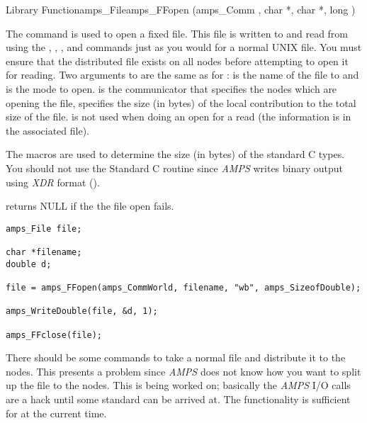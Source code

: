 \begin{deftypefn}{Library Function}{amps_File}{amps\_FFopen}
(amps_Comm , char *, char *, long )

\DESCRIPTION

The  command is used to open a fixed file.  This
file is written to and read from using the ,
, , and
 commands just as you would for a normal
UNIX file.  You must ensure that the distributed file exists on all
nodes before attempting to open it for reading.  Two arguments to
 are the same as for :  is
the name of the file to and  is the mode to open.
 is the communicator that specifies the nodes which are
opening the file,  specifies the size (in bytes) of the
local contribution to the total size of the file.   is not
used when doing an open for a read (the information is in the
associated  file).

The macros  are used to
determine the size (in bytes) of the standard C types.  You should not
use the Standard C  routine since {\em AMPS} writes
binary output using {\em XDR} format (\cite{xdr.87}).

 returns NULL if the the file open fails.

\EXAMPLE
\begin{display}\begin{verbatim}
amps_File file;

char *filename;
double d;

file = amps_FFopen(amps_CommWorld, filename, "wb", amps_SizeofDouble);

amps_WriteDouble(file, &d, 1);

amps_FFclose(file);
\end{verbatim}\end{display}

\NOTES

There should be some commands to take a normal file and distribute it to
the nodes.  This presents a problem since {\em AMPS} does not know how
you want to split up the file to the nodes.  This is being worked on;
basically the {\em AMPS} I/O calls are a hack until some standard can
be arrived at.  The functionality is sufficient for \parflow{} at
the current time.


\end{deftypefn}
